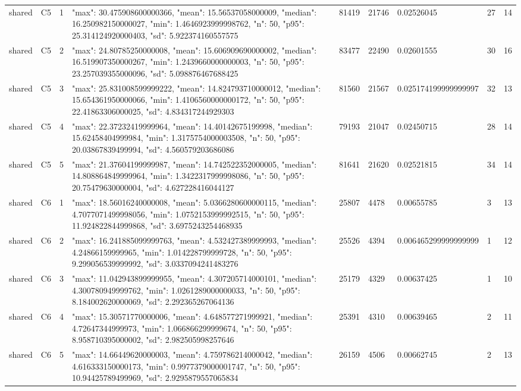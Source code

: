 \begin{tabular}{lllllllll}
shared & C5 & 1 & {"max": 30.475908600000366, "mean": 15.56537058000009, "median": 16.250982150000027, "min": 1.4646923999998762, "n": 50, "p95": 25.314124920000403, "sd": 5.922374160557575} & 81419 & 21746 & 0.02526045 & 27 & 14 \\
shared & C5 & 2 & {"max": 24.80785250000008, "mean": 15.606909690000002, "median": 16.519907350000267, "min": 1.2439660000000003, "n": 50, "p95": 23.257039355000096, "sd": 5.098876467688425} & 83477 & 22490 & 0.02601555 & 30 & 16 \\
shared & C5 & 3 & {"max": 25.831008599999222, "mean": 14.824793710000012, "median": 15.654361950000066, "min": 1.4106560000000172, "n": 50, "p95": 22.41863306000025, "sd": 4.834317244929303} & 81560 & 21567 & 0.025174199999999997 & 32 & 13 \\
shared & C5 & 4 & {"max": 22.37232419999964, "mean": 14.40142675199998, "median": 15.62458404999984, "min": 1.3175754000003508, "n": 50, "p95": 20.03867839499994, "sd": 4.560579203686086} & 79193 & 21047 & 0.02450715 & 28 & 14 \\
shared & C5 & 5 & {"max": 21.37604199999987, "mean": 14.742522352000005, "median": 14.808864849999964, "min": 1.3422317999998086, "n": 50, "p95": 20.75479630000004, "sd": 4.627228416044127} & 81641 & 21620 & 0.02521815 & 34 & 14 \\
shared & C6 & 1 & {"max": 18.56016240000008, "mean": 5.0366280600000115, "median": 4.7077071499998056, "min": 1.0752153999992515, "n": 50, "p95": 11.924822844999868, "sd": 3.6975243254468935} & 25807 & 4478 & 0.00655785 & 3 & 13 \\
shared & C6 & 2 & {"max": 16.241885099999763, "mean": 4.532427389999993, "median": 4.24866159999965, "min": 1.014228799999728, "n": 50, "p95": 9.299056539999992, "sd": 3.0337094241483276} & 25526 & 4394 & 0.006465299999999999 & 1 & 12 \\
shared & C6 & 3 & {"max": 11.042943899999955, "mean": 4.307205714000101, "median": 4.300780949999762, "min": 1.0261289000000033, "n": 50, "p95": 8.184002620000069, "sd": 2.292365267064136} & 25179 & 4329 & 0.00637425 & 1 & 10 \\
shared & C6 & 4 & {"max": 15.30571770000006, "mean": 4.648577271999921, "median": 4.72647344999973, "min": 1.066866299999674, "n": 50, "p95": 8.958710395000002, "sd": 2.982505998257646} & 25391 & 4310 & 0.00639465 & 2 & 11 \\
shared & C6 & 5 & {"max": 14.66449620000003, "mean": 4.759786214000042, "median": 4.616333150000173, "min": 0.9977379000001747, "n": 50, "p95": 10.94425789499969, "sd": 2.9295879557065834} & 26159 & 4506 & 0.00662745 & 2 & 13 \\

\end{tabular}
